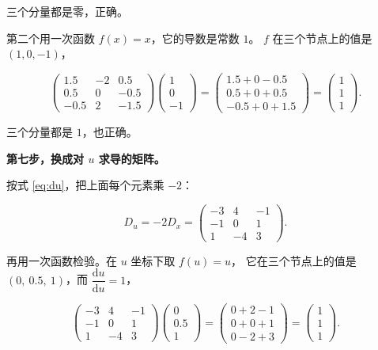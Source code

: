 三个分量都是零，正确。

第二个用一次函数 $f(x)=x$，它的导数是常数 $1$。
$f$ 在三个节点上的值是 $(1,0,-1)$，

\begin{equation}
\begin{pmatrix}1.5 & -2 & 0.5\\ 0.5 & 0 & -0.5\\ -0.5 & 2 & -1.5\end{pmatrix}
\begin{pmatrix}1\\0\\-1\end{pmatrix}
=
\begin{pmatrix}1.5+0-0.5\\ 0.5+0+0.5\\ -0.5+0+1.5\end{pmatrix}
=
\begin{pmatrix}1\\1\\1\end{pmatrix}.
\end{equation}

三个分量都是 $1$，也正确。

\textbf{第七步，换成对 $u$ 求导的矩阵。}

按式 \eqref{eq:du}，把上面每个元素乘 $-2$：

\begin{equation}
D_u=-2D_x=
\begin{pmatrix}
-3 & 4 & -1\\
-1 & 0 & 1\\
1 & -4 & 3
\end{pmatrix}.
\end{equation}

再用一次函数检验。在 $u$ 坐标下取 $f(u)=u$，
它在三个节点上的值是 $(0,\ 0.5,\ 1)$，而 $\dfrac{\mathrm{d}u}{\mathrm{d}u}=1$，

\begin{equation}
\begin{pmatrix}-3 & 4 & -1\\ -1 & 0 & 1\\ 1 & -4 & 3\end{pmatrix}
\begin{pmatrix}0\\0.5\\1\end{pmatrix}
=
\begin{pmatrix}0+2-1\\ 0+0+1\\ 0-2+3\end{pmatrix}
=
\begin{pmatrix}1\\1\\1\end{pmatrix}.
\end{equation}


